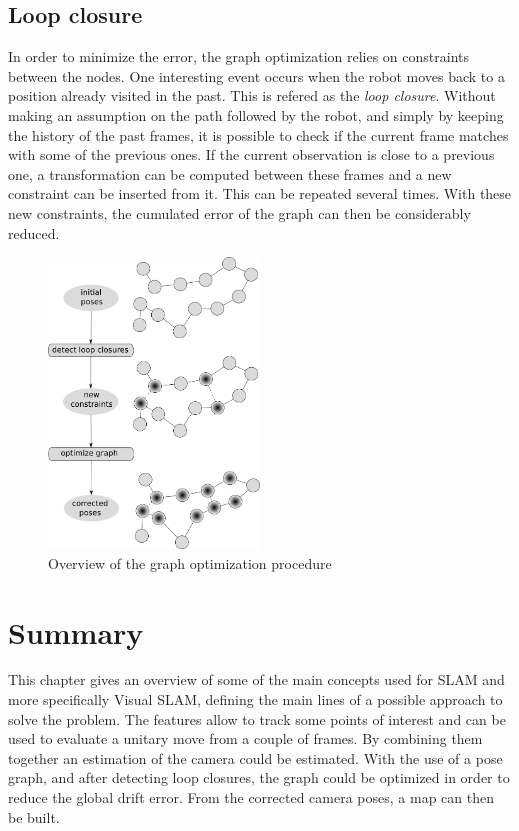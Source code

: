 \subsection{Loop closure}

In order to minimize the error, the graph optimization relies on constraints between the nodes. One interesting event occurs when the robot moves back to a position already visited in the past. This is refered as the \emph{loop closure}. Without making an assumption on the path followed by the robot, and simply by keeping the history of the past frames, it is possible to check if the current frame matches with some of the previous ones. If the current observation is close to a previous one, a transformation can be computed between these frames and a new constraint can be inserted from it. This can be repeated several times. With these new constraints, the cumulated error of the graph can then be considerably reduced. 

\begin{figure}[h!]
\centering
\includegraphics[width=0.5\textwidth]{figures/graph1}
\caption{Overview of the graph optimization procedure}
\end{figure}

\section{Summary}

This chapter gives an overview of some of the main concepts used for SLAM and more specifically Visual SLAM, defining the main lines of a possible approach to solve the problem. The features allow to track some points of interest and can be used to evaluate a unitary move from a couple of frames. By combining them together an estimation of the camera could be estimated. With the use of a pose graph, and after detecting loop closures, the graph could be optimized in order to reduce the global drift error. From the corrected camera poses, a map can then be built. 

